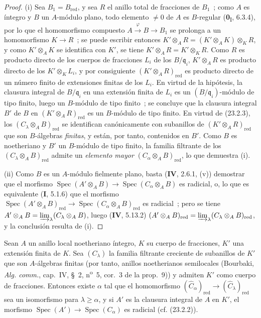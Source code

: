 \begin{proof}
(i) Sea $B_1=B_{\mathrm{red}}$, y sea $R$ el anillo total de
fracciones de $B_1$~; como $A$ es íntegro y $B$ un $A$-módulo plano, todo
elemento $\neq0$ de $A$ es $B$-regular (\textbf{0}\textsubscript{I}, 6.3.4), por lo que
el homomorfismo compuesto $A\xrightarrow{\varphi}B\to B_1$ se prolonga a un
homomorfismo $K\to R$~; se puede escribir entonces
$K'\otimes_AR=(K'\otimes_AK)\otimes_KR$, y como $K'\otimes_AK$
se identifica con $K'$, se tiene $K'\otimes_AR=K'\otimes_KR$. Como $R$ es producto
directo de los cuerpos de fracciones $L_i$ de los $B/\mathfrak q_i$,
$K'\otimes_AR$ es producto directo de los $K'\otimes_KL_i$, y por consiguiente
$(K'\otimes_AR)_{\mathrm{red}}$ es producto directo de un número finito
de extensiones finitas de los $L_i$. En virtud de la hipótesis, la clausura
integral de $B/\mathfrak q_i$ en una extensión finita de $L_i$ es un
$(B/\mathfrak q_i)$-módulo de tipo finito, luego un $B$-módulo de tipo finito~;
se concluye que la clausura integral $B'$ de $B$ en
$(K'\otimes_AR)_{\mathrm{red}}$ es un $B$-módulo de tipo finito. En virtud de
(23.2.3), los $(C_\lambda\otimes_AB)_{\mathrm{red}}$ se identifican
canónicamente con subanillos de $(K'\otimes_AR)_{\mathrm{red}}$ que son
$B$-álgebras \emph{finitas}, y están, por tanto, contenidos en $B'$. Como $B$ es noetheriano
y $B'$ un $B$-módulo de tipo finito, la familia filtrante de los
$(C_\lambda\otimes_AB)_{\mathrm{red}}$ admite un \emph{elemento mayor}
$(C_\alpha\otimes_AB)_{\mathrm{red}}$, lo que demuestra (i).

(ii) Como $B$ es un $A$-módulo fielmente plano, basta
(\textbf{IV}, 2.6.1, (v)) demostrar que el morfismo
$\operatorname{Spec}(A'\otimes_AB)\to
\operatorname{Spec}(C_\alpha\otimes_AB)$ es radicial, o, lo que es equivalente
(\textbf I, 5.1.6) que el morfismo
$\operatorname{Spec}(A'\otimes_AB)_{\mathrm{red}}\to
\operatorname{Spec}(C_\alpha\otimes_AB)_{\mathrm{red}}$ es radicial~; pero
se tiene $A'\otimes_AB=\varinjlim_\lambda(C_\lambda\otimes_AB)$, luego
(\textbf{IV}, 5.13.2)
$(A'\otimes_AB)_{\mathrm{red}}=
\varinjlim_\lambda(C_\lambda\otimes_AB)_{\mathrm{red}}$, y la conclusión
resulta de (i).
\end{proof}

\begin{corollary}[23.2.5]
\label{0.23.2.5-es}
Sean $A$ un anillo local noetheriano íntegro, $K$ su cuerpo de fracciones,
$K'$ una extensión finita de $K$. Sea $(C_\lambda)$ la familia filtrante
creciente de subanillos de $K'$ que son $A$-álgebras finitas \textup{(por tanto,
anillos noetherianos semilocales (Bourbaki, \emph{Alg. comm.}, cap.~IV,
§~2, n\textsuperscript{o}~5, cor.~3 de la prop.~9))} y admiten $K'$ como
cuerpo de fracciones. Entonces existe $\alpha$ tal que el homomorfismo
$(\widehat C_\alpha)_{\mathrm{red}}\to
(\widehat C_\lambda)_{\mathrm{red}}$ sea un isomorfismo para
$\lambda\geqslant\alpha$, y si $A'$ es la clausura integral de $A$ en
$K'$, el morfismo
$\operatorname{Spec}(A')\to\operatorname{Spec}(C_\alpha)$ es radicial
\textup{(cf. (23.2.2))}.
\end{corollary}


